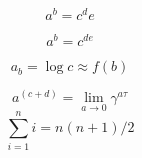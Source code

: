\[  a^b = c^de  \]

\[  a^b = c^{de}  \]

\[  a_b = \log c \approx f(b)  \]

\[  a^{(c + d)} 
    = \lim_{a \to 0} \gamma^{a\tau}  
\]
\[  \sum_{i=1}^n i =  n(n+1)/2 \]
